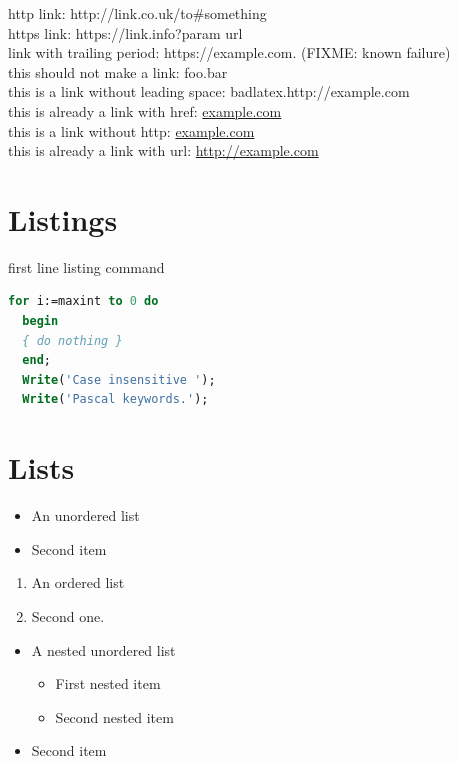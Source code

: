 \documentclass{article}
\begin{document}
  http link: http://link.co.uk/to\#something \\
  https link: https://link.info?param url \\
  link with trailing period: https://example.com. (FIXME: known failure) \\
  this should not make a link: foo.bar \\
  this is a link without leading space: badlatex.http://example.com \\
  this is already a link with href: \href{http://example.com}{example.com} \\
  this is a link without http: \href{example.com}{example.com} \\
  this is already a link with url: \url{http://example.com} \\

  \section{Listings}

  \begin{listing}[step]{first line}
    listing command
  \end{listing}

  \usepackage{listings}
  \begin{lstlisting}[language=Pascal]
  for i:=maxint to 0 do
  begin
  { do nothing }
  end;
  Write('Case insensitive ');
  Write('Pascal keywords.');
  \end{lstlisting}

  \section{Lists}

  \begin{itemize}
    \item An unordered list
    \item Second item
  \end{itemize}

  \begin{enumerate}
    \item An ordered list
    \item Second one.
  \end{enumerate}

  \begin{itemize}
    \item A nested unordered list
    \begin{itemize}
      \item First nested item
      \item Second nested item
    \end{itemize}
    \item Second item
  \end{itemize}
\end{document}
